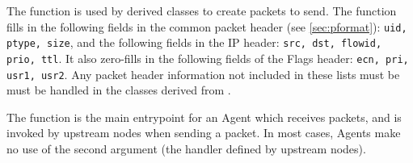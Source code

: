 The  function is used by derived classes to create
packets to send.
The function fills in the following fields in the common packet
header (see \ref{sec:pformat}): {\tt uid, ptype, size}, and the
following fields in the IP header: {\tt src, dst, flowid, prio, ttl}.
It also zero-fills in the following fields of the Flags header:
{\tt ecn, pri, usr1, usr2}.
Any packet header information not included in these lists must
be must be handled in the classes derived from .

The  function is the main entrypoint for an
Agent which receives packets, and
is invoked by upstream nodes when sending a packet.
In most cases, Agents make no use of the second argument (the handler
defined by upstream nodes).

\subsection{}

